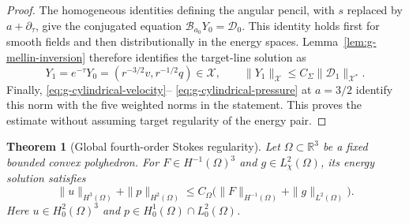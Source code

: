 \documentclass[11pt,a4paper]{article}
\newtheorem{theorem}{Theorem}[section]
\theoremstyle{remark}
\numberwithin{equation}{section}
\begin{document}
\begin{proof}
The homogeneous identities defining the angular pencil, with $s$
replaced by $a+\partial_\tau$, give the conjugated equation
$\mathcal B_{a_0}Y_0=\mathcal D_0$. This identity holds first for
smooth fields and then distributionally in the energy spaces.
Lemma~\ref{lem:g-mellin-inversion} therefore identifies the target-line
solution as
\[
 Y_1=e^{-\tau}Y_0=(r^{-3/2}v,r^{-1/2}q)\in\mathcal X,
 \qquad
 \|Y_1\|_{\mathcal X}\le C_\Sigma\|\mathcal D_1\|_{\mathcal X^*}.
\]
Finally, \eqref{eq:g-cylindrical-velocity}--%
\eqref{eq:g-cylindrical-pressure} at $a=3/2$ identify this norm with
the five weighted norms in the statement. This proves the estimate
without assuming target regularity of the energy pair.
\end{proof}

\begin{theorem}[Global fourth-order Stokes regularity]\label{thm:g-stokes}
Let $\Omega\subset\mathbb R^3$ be a fixed bounded convex polyhedron. For
$F\in H^{-1}(\Omega)^3$ and $g\in L^2_\chi(\Omega)$, its energy solution
satisfies
\[
 \|u\|_{H^3(\Omega)}+\|p\|_{H^2(\Omega)}
 \le C_\Omega\bigl(\|F\|_{H^{-1}(\Omega)}+\|g\|_{L^2(\Omega)}\bigr).
\]
Here $u\in H^2_0(\Omega)^3$ and $p\in H^1_0(\Omega)\cap L^2_0(\Omega)$.
\end{theorem}
\end{document}
